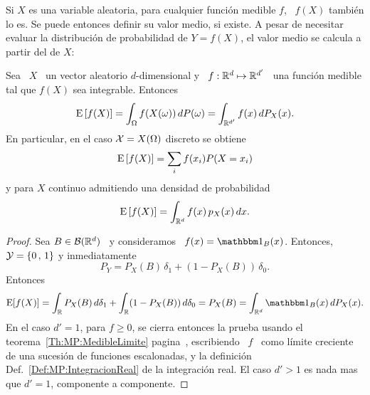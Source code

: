 Si $X$ es una variable aleatoria, para cualquier funci\'on medible $f$, \ $f(X)$
tambi\'en lo es.   Se puede entonces definir su valor medio,  si existe. A pesar
de necesitar evaluar  la distribuci\'on de probabilidad de $Y  = f(X)$, el valor
medio se calcula a partir del de $X$:
%
\begin{teorema}
  Sea  \ $X$  \ un  vector  aleatorio $d$-dimensional  y \  $f: \mathbb{R}^d  \mapsto
  \mathbb{R}^{d'}$ \ una funci\'on medible tal que $f(X)$ sea integrable. Entonces
  \[
  \operatorname{E}\left[   f(X)  \right]   =  \int_\Omega   f(X(\omega))  \,   dP(\omega)  =
  \int_{\mathbb{R}^{d'}} f(x) \, dP_X(x).
  \]
  En particular, en el caso $\mathcal{X} = X(\Omega)$ discreto se obtiene
  \[
  \operatorname{E}\left[ f(X) \right] = \sum_i f(x_i) P(X = x_i)
  \]
  y para $X$ continuo admitiendo una densidad de probabilidad
  \[
  \operatorname{E}\left[ f(X) \right] = \int_{\mathbb{R}^d} f(x) \, p_X(x) \, dx.
  \]
\end{teorema}
%
\begin{proof}
  Sea $B \in \mathcal{B}(\mathbb{R}^d)$ \ y consideramos \ $f(x) = \un_B(x)$. Entonces, $\mathcal{Y}
  = \{  0 \, , \,  1 \}$ y inmediatamente  \[P_Y = P_X(B) \, \delta_1 + (1-P_X(B))
  \, \delta_0.\] Entonces
  \[
  \Esp[f(X)]  =  \int_\Rset  P_X(B)  \,  d\delta_1 +  \int_\Rset  (1-P_X(B))  \,
  d\delta_0 = P_X(B) = \int_{\Rset^d} \un_B(x) \, dP_X(x).
  \]
  En el caso  $d' = 1$, para $f  \ge 0$, se cierra entonces la  prueba usando el
  teorema~\ref{Th:MP:MedibleLimite}         pagina~\pageref{Th:MP:MedibleLimite},
  escribiendo \  $f$ \  como l\'imite creciente  de una sucesi\'on  de funciones
  escalonadas,  y   la  definici\'on  Def.~\ref{Def:MP:IntegracionReal}   de  la
  integraci\'on real. El  caso $d' > 1$ es  nada mas que $d' =  1$, componente a
  componente.
\end{proof}

